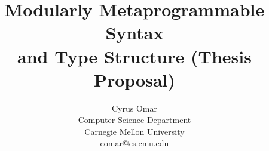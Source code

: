 \documentclass[10pt]{article}
\title{\vspace{-10px}Modularly Metaprogrammable 
Syntax \\and Type Structure (Thesis Proposal)}
\author{Cyrus Omar\\
 Computer Science Department\\
 Carnegie Mellon University\\
 comar@cs.cmu.edu}
\date{}                                           %
\theoremstyle{definition}
\begin{document}
\maketitle

\begin{abstract}


\end{abstract}
\end{document}
